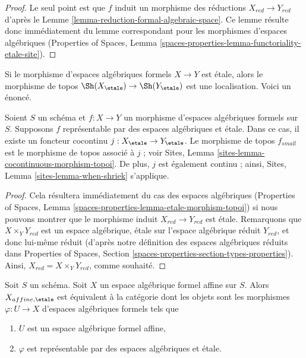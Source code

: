 \begin{proof}
Le seul point est que $f$ induit un morphisme des réductions
$X_{red} \to Y_{red}$ d'après le Lemme \ref{lemma-reduction-formal-algebraic-space}.
Ce lemme résulte donc immédiatement du lemme correspondant pour les
morphismes d'espaces algébriques (Properties of Spaces,
Lemma \ref{spaces-properties-lemma-functoriality-etale-site}).
\end{proof}

\noindent
Si le morphisme d'espaces algébriques formels $X \to Y$ est \'etale,
alors le morphisme de topos $\Sh(X_\etale) \to \Sh(Y_\etale)$
est une localisation. Voici un énoncé.

\begin{lemma}
\label{lemma-etale-morphism-topoi}
Soient $S$ un schéma et $f : X \to Y$ un morphisme
d'espaces algébriques formels sur $S$. Supposons $f$ représentable
par des espaces algébriques et \'etale. Dans ce cas, il existe un
foncteur cocontinu $j : X_\etale \to Y_\etale$.
Le morphisme de topos $f_{small}$ est le
morphisme de topos associé à $j$ ; voir
Sites, Lemma \ref{sites-lemma-cocontinuous-morphism-topoi}.
De plus, $j$ est également continu ; ainsi,
Sites, Lemma \ref{sites-lemma-when-shriek} s'applique.
\end{lemma}

\begin{proof}
Cela résultera immédiatement du cas des espaces algébriques
(Properties of Spaces, Lemma
\ref{spaces-properties-lemma-etale-morphism-topoi})
si nous pouvons montrer que le morphisme induit $X_{red} \to Y_{red}$
est \'etale. Remarquons que $X \times_Y Y_{red}$ est un
espace algébrique, \'etale sur l'espace algébrique réduit $Y_{red}$,
et donc lui-même réduit (d'après notre définition des espaces algébriques
réduits dans Properties of Spaces, Section
\ref{spaces-properties-section-types-properties}).
Ainsi, $X_{red} = X \times_Y Y_{red}$, comme souhaité.
\end{proof}

\begin{lemma}
\label{lemma-affine-identify-affine-etale}
Soit $S$ un schéma. Soit $X$ un espace algébrique formel affine sur $S$.
Alors $X_{affine, \etale}$ est équivalent à la catégorie dont les objets
sont les morphismes $\varphi : U \to X$ d'espaces algébriques formels tels que
\begin{enumerate}
\item $U$ est un espace algébrique formel affine,
\item $\varphi$ est représentable par des espaces algébriques et \'etale.
\end{enumerate}
\end{lemma}

